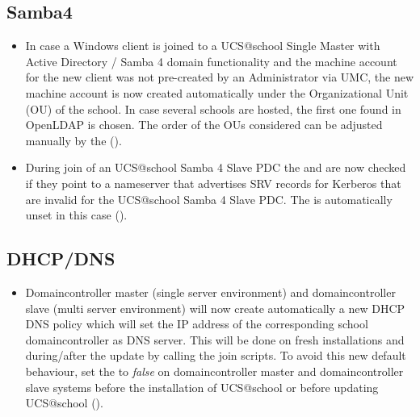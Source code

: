 \subsection{Samba4}
\begin{itemize}
\item In case a Windows client is joined to a UCS@school Single Master with Active Directory / Samba 4 domain functionality and the machine account for the new client was not pre-created by an Administrator via UMC, the new machine account is now created automatically under the Organizational Unit (OU) of the school. In case several schools are hosted, the first one found in OpenLDAP is chosen. The order of the OUs considered can be adjusted manually by the  ().
\item During join of an UCS@school Samba 4 Slave PDC the  and  are now checked if they point to a nameserver that advertises SRV records for Kerberos that are invalid for the UCS@school Samba 4 Slave PDC. The \ucsUCRV{} is automatically unset in this case ().
\end{itemize}

\subsection{DHCP/DNS}
\begin{itemize}
\item Domaincontroller master (single server environment) and domaincontroller slave (multi server
  environment) will now create automatically a new DHCP DNS policy which will set the IP address of the
  corresponding school domaincontroller as DNS server. This will be done on fresh installations and
  during/after the update by calling the join scripts. To avoid this new default behaviour, set the
   to \emph{false} on domaincontroller master
  and domaincontroller slave systems before the installation of UCS@school or before updating UCS@school
  ().
\end{itemize}



